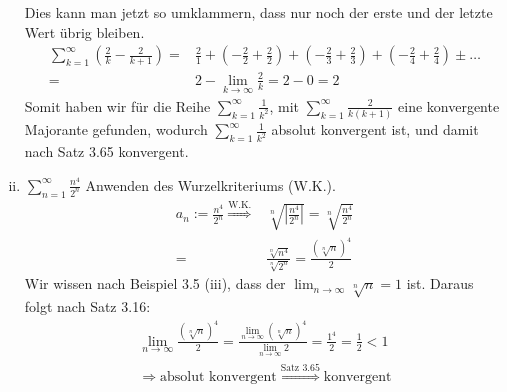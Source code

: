 \documentclass{scrartcl}
\begin{document}
\begin{enumerate}[(i)]
			Dies kann man jetzt so umklammern, dass nur noch der erste und der letzte Wert übrig bleiben.
			\begin{align*}
				\sum^{\infty}_{k=1}\left(\frac{2}{k}-\frac{2}{k+1}\right) = &\frac{2}{1} + \left(-\frac{2}{2} + \frac{2}{2}\right) + \left(-\frac{2}{3} + \frac{2}{3}\right) + \left(-\frac{2}{4} + \frac{2}{4}\right) \pm \ldots \\
				= & 2 - \lim_{k \to \infty}\frac{2}{k} = 2 - 0 = 2
			\end{align*}
			Somit haben wir für die Reihe $\sum^{\infty}_{k=1}\frac{1}{k^2}$, mit $\sum^{\infty}_{k=1}\frac{2}{k(k + 1)}$ eine konvergente Majorante gefunden, wodurch $\sum^{\infty}_{k=1}\frac{1}{k^2}$ absolut konvergent ist, und damit nach Satz 3.65 konvergent.
			
		\item $\sum^{\infty}_{n=1}\frac{n^4}{2^n}$ Anwenden des Wurzelkriteriums (W.K.).
			\begin{align*}
				a_n:=\frac{n^4}{2^n} \overset{\text{W.K.}}{\Rightarrow} &\sqrt[n]{\left|\frac{n^4}{2^n}\right|} = \sqrt[n]{\frac{n^4}{2^n}} \\
				= &\frac{\sqrt[n]{n^4}}{\sqrt[n]{2^n}} = \frac{(\sqrt[n]{n})^4}{2}
			\end{align*}
			Wir wissen nach Beispiel 3.5 (iii), dass der $\lim_{n \to \infty}\sqrt[n]{n} = 1$ ist. Daraus folgt nach Satz 3.16:
			\begin{align*}
				\lim_{n \to \infty} \frac{(\sqrt[n]{n})^4}{2} = \frac{\lim_{n \to \infty} (\sqrt[n]{n})^4}{\lim_{n \to \infty} 2} = \frac{1^4}{2} = \frac{1}{2} < 1 \\
				\Rightarrow \text{absolut konvergent} \overset{\text{Satz 3.65}}{\Longrightarrow} \text{konvergent}
			\end{align*}
		

\end{enumerate}
\end{document}
